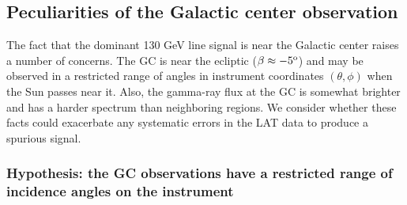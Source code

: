 \documentclass[aps,twocolumn,prd,superscriptaddress,showpacs,nofootinbib,fixfloat]{revtex4}
\newcommand{\degree}{^{\rm o}}
\begin{document}
\subsection{Peculiarities of the Galactic center observation}

The fact that the dominant 130 GeV line signal is near the Galactic center
raises a number of concerns.  The GC is near the ecliptic ($\beta \approx
-5\degree$) and may be observed in a restricted range of angles in instrument
coordinates $(\theta, \phi)$ when the Sun passes near it.  Also, the gamma-ray
flux at the GC is somewhat brighter and has a harder spectrum than neighboring
regions.  We consider whether these facts could exacerbate any systematic
errors in the LAT data to produce a spurious signal.

\subsubsection{Hypothesis: the GC observations have a restricted range of
incidence angles on the instrument}
\end{document}
